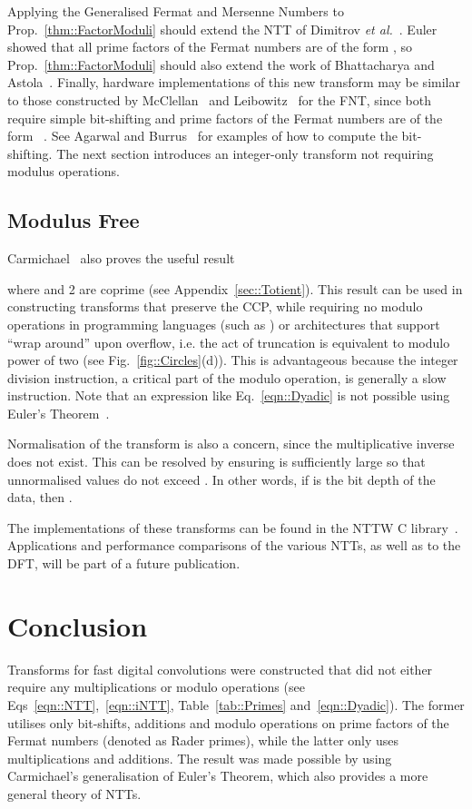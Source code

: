 \documentclass[twocolumn]{IEEEtran}
\newcommand{\eqnTag}{Eq.}
\newcommand{\eqnsTag}{Eqs}
\newcommand{\figTag}{Fig.}
\newcommand{\tabTag}{Table}
\newcommand{\secTag}{Sec.}
\newcommand{\propTag}{Prop.}
\begin{document}
Applying the Generalised Fermat and Mersenne Numbers to \propTag~\ref{thm::FactorModuli} should extend the \ac{NTT} of Dimitrov \emph{et al.}~\citep{Dimitrov1994}. Euler~\citep{Euler1732} showed that all prime factors of the Fermat numbers are of the form , so \propTag~\ref{thm::FactorModuli} should also extend the work of Bhattacharya and Astola~\citep{Bhattacharya2000}. Finally, hardware implementations of this new transform may be similar to those constructed by McClellan~\citep{McClellan1976} and Leibowitz~\citep{Leibowitz1976} for the \ac{FNT}, since both require simple bit-shifting and prime factors of the Fermat numbers are of the form ~\citep{Euler1732}. See Agarwal and Burrus~\citep[\secTag VI.E]{Agarwal1974} for examples of how to compute the bit-shifting. The next section introduces an integer-only transform not requiring modulus operations.


\subsection{Modulus Free}
Carmichael~\citep{Carmichael1910} also proves the useful result

where  and 2 are coprime (see Appendix~\ref{sec::Totient}). This result can be used in constructing transforms that preserve the \ac{CCP}, while requiring no modulo operations in programming languages (such as ) or architectures that support ``wrap around'' upon overflow, i.e. the act of truncation is equivalent to modulo power of two (see \figTag~\ref{fig::Circles}(d)). This is advantageous because the integer division instruction, a critical part of the modulo operation, is generally a slow instruction. Note that an expression like \eqnTag~\eqref{eqn::Dyadic} is not possible using Euler's Theorem~\citep{Carmichael1910}.

Normalisation of the transform is also a concern, since the multiplicative inverse does not exist. This can be resolved by ensuring  is sufficiently large so that unnormalised values do not exceed . In other words, if  is the bit depth of the data, then . 

The implementations of these transforms can be found in the NTTW C library~\citep{Chandra2009b}. Applications and performance comparisons of the various \acp{NTT}, as well as to the \ac{DFT}, will be part of a future publication.

\section*{Conclusion}\label{sec::Conclusion}
Transforms for fast digital convolutions were constructed that did not either require any multiplications or modulo operations (see \eqnsTag~\eqref{eqn::NTT},~\eqref{eqn::iNTT}, \tabTag~\ref{tab::Primes} and~\eqref{eqn::Dyadic}). The former utilises only bit-shifts, additions and modulo operations on prime factors of the Fermat numbers (denoted as Rader primes), while the latter only uses multiplications and additions. The result was made possible by using Carmichael's generalisation of Euler's Theorem, which also provides a more general theory of \aclp{NTT}.
\end{document}
